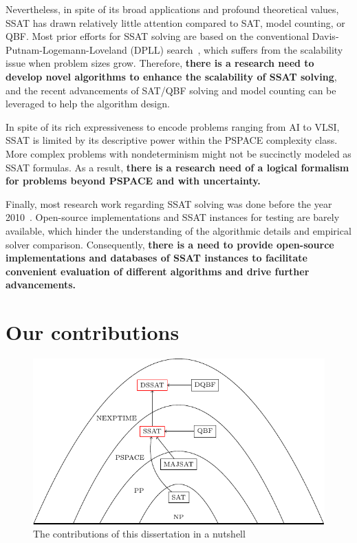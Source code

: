 Nevertheless, in spite of its broad applications and profound theoretical values,
SSAT has drawn relatively little attention compared to SAT, model counting, or QBF.
Most prior efforts for SSAT solving are based on the conventional
Davis-Putnam-Logemann-Loveland (DPLL) search~\cite{Davis1962},
which suffers from the scalability issue when problem sizes grow.
Therefore, \textbf{there is a research need to develop novel algorithms to enhance the scalability of SSAT solving},
and the recent advancements of SAT/QBF solving and model counting can be leveraged to help the algorithm design.

In spite of its rich expressiveness to encode problems ranging from AI to VLSI,
SSAT is limited by its descriptive power within the PSPACE complexity class.
More complex problems with nondeterminism might not be succinctly modeled as SSAT formulas.
As a result, \textbf{there is a research need of a logical formalism for problems beyond PSPACE and with uncertainty.}

Finally, most research work regarding SSAT solving was done
before the year 2010~\cite{Majercik1998,Majercik2003,Majercik2004,Majercik2005,Teige2010,SATHandbook-SSAT}.
Open-source implementations and SSAT instances for testing are barely available,
which hinder the understanding of the algorithmic details and empirical solver comparison.
Consequently, \textbf{there is a need to provide open-source implementations and databases of SSAT instances to facilitate convenient evaluation of different algorithms and drive further advancements.}

\section{Our contributions}
\begin{figure}[t]
      \centering
      \includegraphics{fig/build/nutshell.pdf}
      \caption{The contributions of this dissertation in a nutshell}
      \label{fig:intro-nutshell}
\end{figure}

